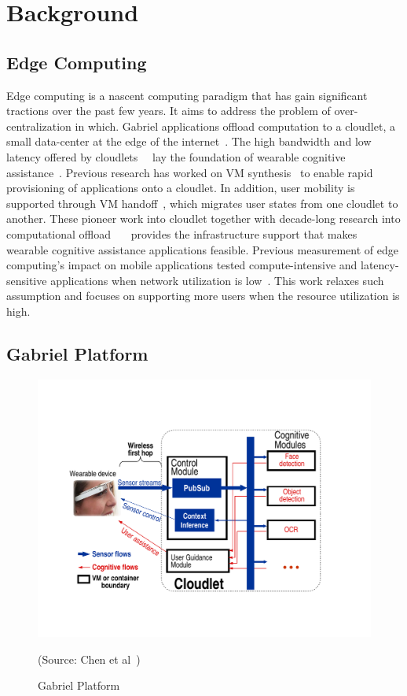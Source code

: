 \chapter{Background}
\label{chapter: background}

\section{Edge Computing}

Edge computing is a nascent computing paradigm that has gain significant
tractions over the past few years. It aims to address the problem of
over-centralization in which. Gabriel applications offload computation to a
cloudlet, a small data-center at the edge of the
internet~\cite{satyanarayanan2009case}. The high bandwidth and low latency
offered by cloudlets~\cite{ha2013impact}~\cite{hu2016quantifying} lay the
foundation of wearable cognitive assistance~\cite{ha2014towards}. Previous
research has worked on VM synthesis~\cite{ha2013just} to enable rapid
provisioning of applications onto a cloudlet. In addition, user mobility is
supported through VM handoff~\cite{ha2017you}, which migrates user states from
one cloudlet to another. These pioneer work into cloudlet together with
decade-long research into computational
offload~\cite{cuervo2010maui}~\cite{gordon2012comet}~\cite{flinn2012cyber}
provides the infrastructure support that makes wearable cognitive assistance
applications feasible. Previous measurement of edge computing's impact on mobile
applications tested compute-intensive and latency-sensitive applications when
network utilization is low~\cite{chen2017empirical}. This work relaxes such
assumption and focuses on supporting more users when the resource utilization is
high.


\section{Gabriel Platform}

\begin{figure}
\centering
\includegraphics[width=0.8\linewidth]{FIGS/fig-backend-structure-simple-crop.pdf}
\begin{captiontext}
{\rm (Source: Chen et al~\cite{chen2017empirical})}
\end{captiontext}
\caption{\small Gabriel Platform}
\label{fig:gabriel}
\end{figure}

